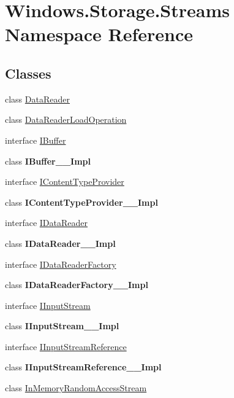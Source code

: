\hypertarget{namespace_windows_1_1_storage_1_1_streams}{}\section{Windows.\+Storage.\+Streams Namespace Reference}
\label{namespace_windows_1_1_storage_1_1_streams}
\subsection*{Classes}
\begin{DoxyCompactItemize}
\item 
class \hyperlink{class_windows_1_1_storage_1_1_streams_1_1_data_reader}{Data\+Reader}
\item 
class \hyperlink{class_windows_1_1_storage_1_1_streams_1_1_data_reader_load_operation}{Data\+Reader\+Load\+Operation}
\item 
interface \hyperlink{interface_windows_1_1_storage_1_1_streams_1_1_i_buffer}{I\+Buffer}
\item 
class {\bfseries I\+Buffer\+\_\+\+\_\+\+Impl}
\item 
interface \hyperlink{interface_windows_1_1_storage_1_1_streams_1_1_i_content_type_provider}{I\+Content\+Type\+Provider}
\item 
class {\bfseries I\+Content\+Type\+Provider\+\_\+\+\_\+\+Impl}
\item 
interface \hyperlink{interface_windows_1_1_storage_1_1_streams_1_1_i_data_reader}{I\+Data\+Reader}
\item 
class {\bfseries I\+Data\+Reader\+\_\+\+\_\+\+Impl}
\item 
interface \hyperlink{interface_windows_1_1_storage_1_1_streams_1_1_i_data_reader_factory}{I\+Data\+Reader\+Factory}
\item 
class {\bfseries I\+Data\+Reader\+Factory\+\_\+\+\_\+\+Impl}
\item 
interface \hyperlink{interface_windows_1_1_storage_1_1_streams_1_1_i_input_stream}{I\+Input\+Stream}
\item 
class {\bfseries I\+Input\+Stream\+\_\+\+\_\+\+Impl}
\item 
interface \hyperlink{interface_windows_1_1_storage_1_1_streams_1_1_i_input_stream_reference}{I\+Input\+Stream\+Reference}
\item 
class {\bfseries I\+Input\+Stream\+Reference\+\_\+\+\_\+\+Impl}
\item 
class \hyperlink{class_windows_1_1_storage_1_1_streams_1_1_in_memory_random_access_stream}{In\+Memory\+Random\+Access\+Stream}

\end{DoxyCompactItemize}
